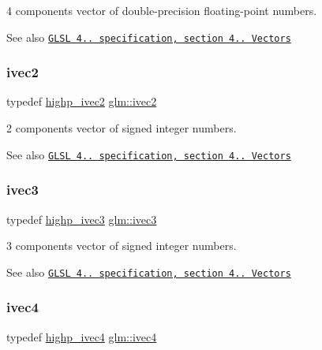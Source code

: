4 components vector of double-\/precision floating-\/point numbers.

\begin{DoxySeeAlso}{See also}
\href{http://www.opengl.org/registry/doc/GLSLangSpec.4.20.8.pdf}{\tt G\+L\+SL 4.. specification, section 4.. Vectors} 
\end{DoxySeeAlso}
\mbox{\label{group__core__types_ga9e6ce9cfc7919976b318197e18d8a065}} 
\subsubsection{\texorpdfstring{ivec2}{ivec2}}
{\footnotesize\ttfamily typedef \hyperlink{group__core__precision_ga01acd79fbbe3d93a532276586b5c39ee}{highp\+\_\+ivec2} \hyperlink{group__core__types_ga9e6ce9cfc7919976b318197e18d8a065}{glm\+::ivec2}}

2 components vector of signed integer numbers.

\begin{DoxySeeAlso}{See also}
\href{http://www.opengl.org/registry/doc/GLSLangSpec.4.20.8.pdf}{\tt G\+L\+SL 4.. specification, section 4.. Vectors} 
\end{DoxySeeAlso}
\mbox{\label{group__core__types_ga6e12a4ca00d696f07da1df4eb73e0fe8}} 
\subsubsection{\texorpdfstring{ivec3}{ivec3}}
{\footnotesize\ttfamily typedef \hyperlink{group__core__precision_gaef51de6bc442bfce2602dc301708720a}{highp\+\_\+ivec3} \hyperlink{group__core__types_ga6e12a4ca00d696f07da1df4eb73e0fe8}{glm\+::ivec3}}

3 components vector of signed integer numbers.

\begin{DoxySeeAlso}{See also}
\href{http://www.opengl.org/registry/doc/GLSLangSpec.4.20.8.pdf}{\tt G\+L\+SL 4.. specification, section 4.. Vectors} 
\end{DoxySeeAlso}
\mbox{\label{group__core__types_gaa4560ddc50320ea8f8a70d5c9c249fea}} 
\subsubsection{\texorpdfstring{ivec4}{ivec4}}
{\footnotesize\ttfamily typedef \hyperlink{group__core__precision_ga9303c2a9e1f1e761961eeecbcda2d34f}{highp\+\_\+ivec4} \hyperlink{group__core__types_gaa4560ddc50320ea8f8a70d5c9c249fea}{glm\+::ivec4}}

